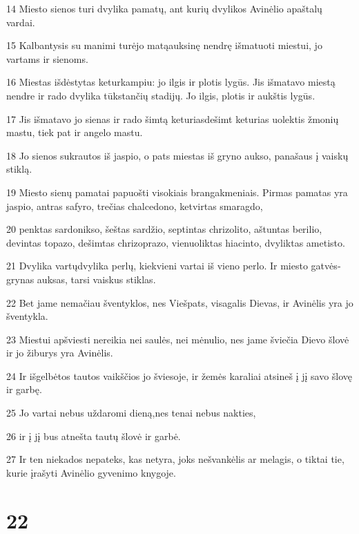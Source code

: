 \par 14 Miesto sienos turi dvylika pamatų, ant kurių dvylikos Avinėlio apaštalų vardai. 
\par 15 Kalbantysis su manimi turėjo matą­auksinę nendrę išmatuoti miestui, jo vartams ir sienoms. 
\par 16 Miestas išdėstytas keturkampiu: jo ilgis ir plotis lygūs. Jis išmatavo miestą nendre ir rado dvylika tūkstančių stadijų. Jo ilgis, plotis ir aukštis lygūs. 
\par 17 Jis išmatavo jo sienas ir rado šimtą keturiasdešimt keturias uolektis žmonių mastu, tiek pat ir angelo mastu. 
\par 18 Jo sienos sukrautos iš jaspio, o pats miestas iš gryno aukso, panašaus į vaiskų stiklą. 
\par 19 Miesto sienų pamatai papuošti visokiais brangakmeniais. Pirmas pamatas yra jaspio, antras safyro, trečias chalcedono, ketvirtas smaragdo, 
\par 20 penktas sardonikso, šeštas sardžio, septintas chrizolito, aštuntas berilio, devintas topazo, dešimtas chrizoprazo, vienuoliktas hiacinto, dvyliktas ametisto. 
\par 21 Dvylika vartų­dvylika perlų, kiekvieni vartai iš vieno perlo. Ir miesto gatvės­grynas auksas, tarsi vaiskus stiklas. 
\par 22 Bet jame nemačiau šventyklos, nes Viešpats, visagalis Dievas, ir Avinėlis yra jo šventykla. 
\par 23 Miestui apšviesti nereikia nei saulės, nei mėnulio, nes jame šviečia Dievo šlovė ir jo žiburys yra Avinėlis. 
\par 24 Ir išgelbėtos tautos vaikščios jo šviesoje, ir žemės karaliai atsineš į jį savo šlovę ir garbę. 
\par 25 Jo vartai nebus uždaromi dieną,­nes tenai nebus nakties,­ 
\par 26 ir į jį bus atnešta tautų šlovė ir garbė. 
\par 27 Ir ten niekados nepateks, kas netyra, joks nešvankėlis ar melagis, o tiktai tie, kurie įrašyti Avinėlio gyvenimo knygoje.


\chapter{22}


